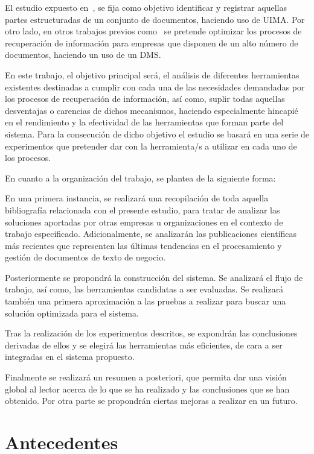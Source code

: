 \documentclass[runningheads,a4paper]{llncs}
\theoremstyle{break}
\begin{document}
El estudio expuesto en~\cite{intro:9}, se fija como objetivo  identificar y registrar aquellas partes estructuradas de un conjunto de documentos, haciendo uso de UIMA. Por otro lado, en otros trabajos previos como~\cite{icai:2014} se pretende optimizar los procesos de recuperación de información para empresas que disponen de un alto número de documentos, haciendo un uso de un DMS.

En este trabajo, el objetivo principal será, el análisis de diferentes herramientas existentes destinadas a cumplir con cada una de las necesidades demandadas por los procesos de recuperación de información, así como, suplir todas aquellas desventajas o carencias de dichos mecanismos, haciendo especialmente hincapié en el rendimiento y la efectividad de las herramientas que forman parte del sistema. Para la consecución de dicho objetivo el estudio se basará en una serie de experimentos que pretender dar con la herramienta/s a utilizar en cada uno de los procesos.

En cuanto a la organización del trabajo, se plantea de la siguiente forma:

En una primera instancia, se realizará una recopilación de toda aquella bibliografía relacionada con el presente estudio, para tratar de analizar las soluciones aportadas por otras empresas u organizaciones en el contexto de trabajo especificado. Adicionalmente, se analizarán las publicaciones científicas más recientes que representen las últimas tendencias en el procesamiento y gestión de documentos de texto de negocio.

Posteriormente se propondrá la construcción del sistema. Se analizará  el flujo de trabajo, así como, las herramientas candidatas a ser evaluadas. Se realizará también una primera aproximación a las pruebas a realizar para buscar una solución optimizada para el sistema.

Tras la realización de los experimentos descritos, se expondrán las conclusiones derivadas de ellos y se elegirá las herramientas más eficientes, de cara a ser integradas en el sistema propuesto.

Finalmente se realizará un resumen a posteriori, que permita dar una visión global al lector acerca de lo que se ha realizado y las conclusiones que se han obtenido. Por otra parte se propondrán ciertas mejoras a realizar en un futuro.

\section{Antecedentes}
\end{document}
